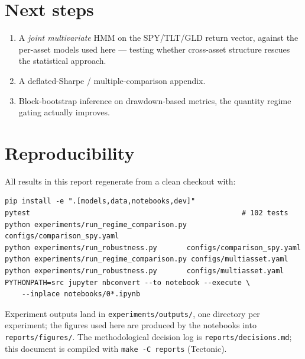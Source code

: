 \documentclass[11pt]{article}
\newcommand{\code}[1]{\texttt{#1}}
\begin{document}
\section{Next steps}

\begin{enumerate}
  \item A \emph{joint multivariate} HMM on the SPY/TLT/GLD return vector,
        against the per-asset models used here --- testing whether
        cross-asset structure rescues the statistical approach.
  \item A deflated-Sharpe / multiple-comparison appendix.
  \item Block-bootstrap inference on drawdown-based metrics, the quantity
        regime gating actually improves.
\end{enumerate}

\appendix
\section{Reproducibility}

All results in this report regenerate from a clean checkout with:

\begin{verbatim}
pip install -e ".[models,data,notebooks,dev]"
pytest                                                  # 102 tests
python experiments/run_regime_comparison.py configs/comparison_spy.yaml
python experiments/run_robustness.py       configs/comparison_spy.yaml
python experiments/run_regime_comparison.py configs/multiasset.yaml
python experiments/run_robustness.py       configs/multiasset.yaml
PYTHONPATH=src jupyter nbconvert --to notebook --execute \
    --inplace notebooks/0*.ipynb
\end{verbatim}

Experiment outputs land in \code{experiments/outputs/}, one directory per
experiment; the figures used here are produced by the notebooks into
\code{reports/figures/}. The methodological decision log is
\code{reports/decisions.md}; this document is compiled with
\code{make -C reports} (Tectonic).
\end{document}
